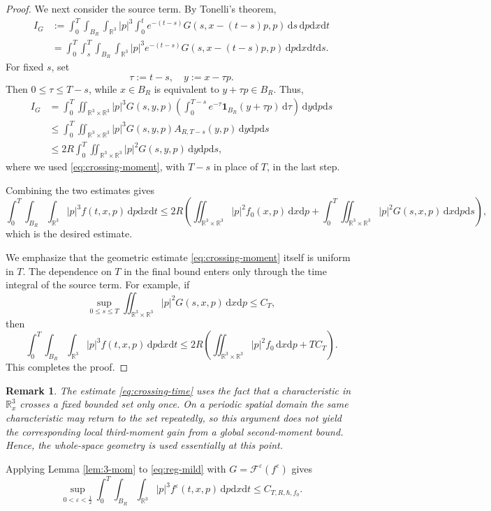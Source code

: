 \documentclass[10pt,reqno]{amsart}
\numberwithin{equation}{section}
\newtheorem{remark}{Remark}[section]
\theoremstyle{definition}
\newcommand{\R}{\mathbb R}
\newcommand{\dd}{\mathrm d}
\newcommand{\dx}{\mathrm{d}x}
\newcommand{\dpp}{\mathrm{d}p}
\newcommand{\dt}{\mathrm{d}t}
\newcommand{\ds}{\mathrm{d}s}
\newcommand{\dy}{\mathrm{d}y}
\newcommand{\e}{\varepsilon}
\newcommand{\one}{\mathbf 1}
\newcommand{\calF}{\mathcal F}
\newcommand{\bq}{\begin{equation}}
\newcommand{\eq}{\end{equation}}
\newcommand{\lt}{\left}
\newcommand{\rt}{\right}
\begin{document}
\begin{proof}
We next consider the source term.  By Tonelli's theorem,
\begin{align*}
 I_G  &:=  \int_0^T\int_{B_R}\int_{\R^3}|p|^3  \int_0^t e^{-(t-s)}  G(s,x-(t-s)p,p)\,\ds  \,\dpp\dx\dt  \\
 &=  \int_0^T\int_s^T\int_{B_R}\int_{\R^3}  |p|^3e^{-(t-s)}  G(s,x-(t-s)p,p)  \,\dpp\dx\dt\ds.
\end{align*}
For fixed $s$, set
\[
 \tau:=t-s,  \quad  y:=x-\tau p.
\]
Then $0\leq\tau\leq T-s$, while $x\in B_R$ is equivalent to $y+\tau p\in B_R$.
Thus,
\begin{align*}
 I_G  &=  \int_0^T  \iint_{\R^3\times\R^3}  |p|^3G(s,y,p)  \lt(  \int_0^{T-s}  e^{-\tau}\one_{B_R}(y+\tau p)\,\dd\tau  \rt)  \,\dy\dpp\ds  \\
 &\leq  \int_0^T  \iint_{\R^3\times\R^3}  |p|^3G(s,y,p)  A_{R,T-s}(y,p)  \,\dy\dpp\ds  \\
 &\leq  2R  \int_0^T  \iint_{\R^3\times\R^3}  |p|^2G(s,y,p)\,\dy\dpp\ds,
\end{align*}
where we used \eqref{eq:crossing-moment}, with $T-s$ in place of $T$, in the last step.

Combining the two estimates gives
\[
\int_0^T\int_{B_R}\int_{\R^3}  |p|^3f(t,x,p)\,\dpp\dx\dt  \leq  2R\lt(  \iint_{\R^3\times\R^3}  |p|^2f_0(x,p)\,\dx\dpp  +  \int_0^T  \iint_{\R^3\times\R^3}  |p|^2G(s,x,p)\,\dx\dpp\ds  \rt),
\]
which is the desired estimate.

We emphasize that the geometric estimate \eqref{eq:crossing-moment} itself is uniform in $T$. The dependence on $T$ in the final bound enters only through the time integral of the source term.  For example, if
\[
 \sup_{0\leq s\leq T}  \iint_{\R^3\times\R^3}  |p|^2G(s,x,p)\,\dx\dpp  \leq C_T,
\]
then
\[
 \int_0^T\int_{B_R}\int_{\R^3}  |p|^3f(t,x,p)\,\dpp\dx\dt  \leq  2R\lt(  \iint_{\R^3\times\R^3}|p|^2f_0\,\dx\dpp  +TC_T  \rt).
\]
This completes the proof.
\end{proof}

\begin{remark}
The estimate \eqref{eq:crossing-time} uses the fact that a characteristic in $\R^3_x$ crosses a fixed bounded set only once.  On a periodic spatial domain the same characteristic may return to the set repeatedly, so this argument does not yield the corresponding local third-moment gain from a global second-moment bound.  Hence, the whole-space geometry is used essentially at this point.
\end{remark}

Applying Lemma \ref{lem:3-mom} to \eqref{eq:reg-mild} with $G=\calF^\e(f^\e)$ gives
\bq \label{eq:third-uni}
 \sup_{0<\e<\frac12}  \int_0^T\int_{B_R}\int_{\R^3}|p|^3f^\e(t,x,p)\,\dpp\dx\dt  \leq C_{T,R,\hbar,f_0}.
\eq
\end{document}
